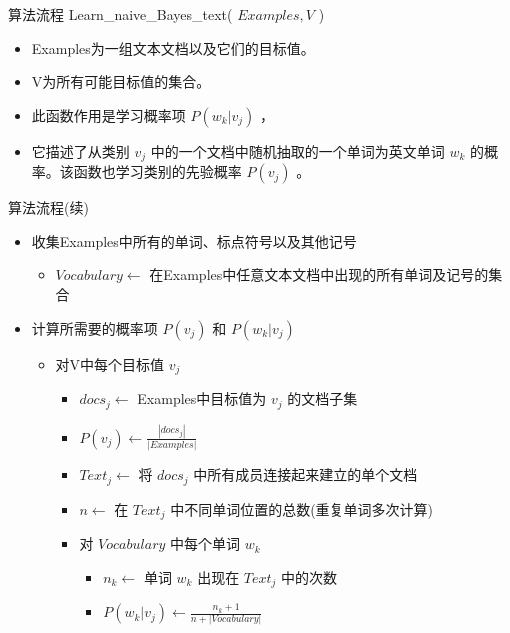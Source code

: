 \documentclass[presentation]{beamer}
\begin{document}
\begin{frame}[label={sec:orgc2a7b71}]{算法流程}
Learn\_naive\_Bayes\_text( \(Examples, V\) )
\begin{itemize}
\item Examples为一组文本文档以及它们的目标值。
\item V为所有可能目标值的集合。
\item 此函数作用是学习概率项 \(P(w_k|v_j)\) ，
\item 它描述了从类别 \(v_j\) 中的一个文档中随机抽取的一个单词为英文单词 \(w_k\) 的概率。该函数也学习类别的先验概率 \(P(v_j)\) 。
\end{itemize}
\end{frame}

\begin{frame}[label={sec:orge76d8c9}]{算法流程(续)}
\begin{itemize}
\item 收集Examples中所有的单词、标点符号以及其他记号
\begin{itemize}
\item \(Vocabulary \leftarrow\) 在Examples中任意文本文档中出现的所有单词及记号的集合
\end{itemize}
\item 计算所需要的概率项 \(P(v_j)\) 和 \(P(w_k|v_j)\)
\begin{itemize}
\item 对V中每个目标值 \(v_j\)
\begin{itemize}
\item \(docs_{j} \leftarrow\) Examples中目标值为 \(v_j\) 的文档子集
\item \(P(v_{j}) \leftarrow \frac{|docs_{j}|}{|Examples|}\)
\item \(Text_{j} \leftarrow\) 将 \(docs_j\) 中所有成员连接起来建立的单个文档
\item \(n \leftarrow\) 在 \(Text_j\) 中不同单词位置的总数(重复单词多次计算)
\item 对 \(Vocabulary\) 中每个单词 \(w_k\)
\begin{itemize}
\item \(n_{k} \leftarrow\) 单词 \(w_k\) 出现在 \(Text_j\) 中的次数
\item \(P(w_{k}|v_{j}) \leftarrow \frac{n_{k} + 1}{n + |Vocabulary|}\)
\end{itemize}
\end{itemize}
\end{itemize}
\end{itemize}
\end{frame}
\end{document}
